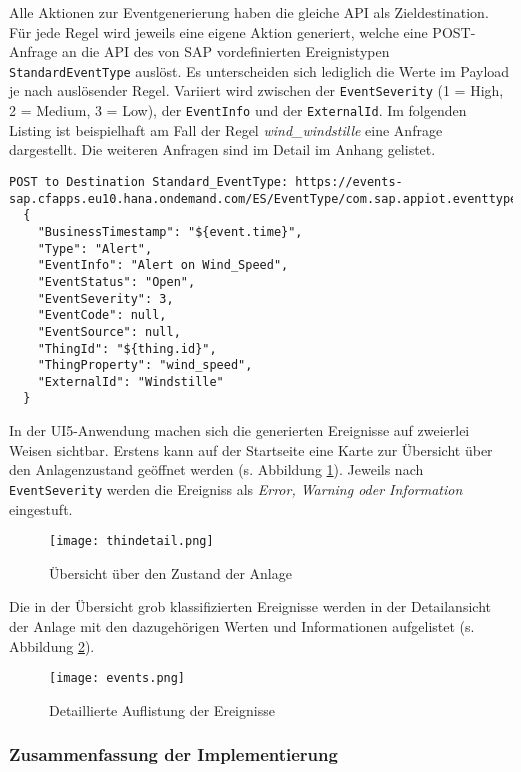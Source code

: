 Alle Aktionen zur Eventgenerierung haben die gleiche API als Zieldestination. Für jede Regel wird jeweils eine eigene Aktion generiert, welche eine POST-Anfrage an die API des von SAP vordefinierten Ereignistypen \texttt{StandardEventType} auslöst. Es unterscheiden sich lediglich die Werte im Payload je nach auslösender Regel. Variiert wird zwischen der \texttt{EventSeverity} (1 = High, 2 = Medium, 3 = Low), der \texttt{EventInfo} und der \texttt{ExternalId}. Im folgenden Listing ist beispielhaft am Fall der Regel \textit{wind\_windstille} eine Anfrage dargestellt. Die weiteren Anfragen sind im Detail im Anhang gelistet.
\newline
\begin{lstlisting}[caption= Beispielanfrage für die Generierung eines Ereignisses]
  POST to Destination Standard_EventType: https://events-sap.cfapps.eu10.hana.ondemand.com/ES/EventType/com.sap.appiot.eventtypes:StandardEventType/v1/Events
  {
    "BusinessTimestamp": "${event.time}",
    "Type": "Alert",
    "EventInfo": "Alert on Wind_Speed",
    "EventStatus": "Open",
    "EventSeverity": 3,
    "EventCode": null,
    "EventSource": null,
    "ThingId": "${thing.id}",
    "ThingProperty": "wind_speed",
    "ExternalId": "Windstille"
  }
\end{lstlisting}

\noindent In der UI5-Anwendung machen sich die generierten Ereignisse auf zweierlei Weisen sichtbar. Erstens kann auf der Startseite eine Karte zur Übersicht über den Anlagenzustand geöffnet werden (s. Abbildung \ref{detailoverview}). Jeweils nach \texttt{EventSeverity} werden die Ereigniss als \textit{Error, Warning oder Information} eingestuft. 

\begin{figure}[H]
  \centering
  \texttt{[image: thindetail.png]}
  \caption{Übersicht über den Zustand der Anlage}
  \label{detailoverview}
\end{figure}
\vspace{2mm}
\noindent Die in der Übersicht grob klassifizierten Ereignisse werden in der Detailansicht der Anlage mit den dazugehörigen Werten und Informationen aufgelistet (s. Abbildung \ref{thingdetail}).
\begin{figure}[H]
  \centering
  \texttt{[image: events.png]}
  \caption{Detaillierte Auflistung der Ereignisse}
  \label{thingdetail}
\end{figure}


\subsubsection{Zusammenfassung der Implementierung}


